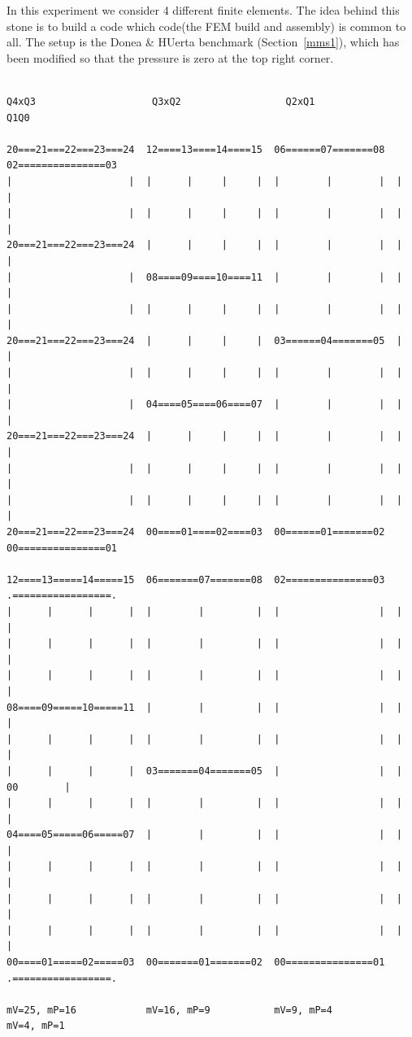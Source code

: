 In this experiment we consider 4 different finite elements. The idea behind this stone 
is to build a code which code(the FEM build and assembly) is common to all. 
The setup is the Donea \& HUerta benchmark (Section~\ref{mms1}), which has been modified so that 
the pressure is zero at the top right corner.

\begin{verbatim}

Q4xQ3                    Q3xQ2                  Q2xQ1                 Q1Q0

20===21===22===23===24  12====13====14====15  06======07=======08  02===============03
|                    |  |      |     |     |  |        |        |  |                 |
|                    |  |      |     |     |  |        |        |  |                 |
20===21===22===23===24  |      |     |     |  |        |        |  |                 |
|                    |  08====09====10====11  |        |        |  |                 |
|                    |  |      |     |     |  |        |        |  |                 |
20===21===22===23===24  |      |     |     |  03======04=======05  |                 |
|                    |  |      |     |     |  |        |        |  |                 |
|                    |  04====05====06====07  |        |        |  |                 |
20===21===22===23===24  |      |     |     |  |        |        |  |                 |
|                    |  |      |     |     |  |        |        |  |                 |
|                    |  |      |     |     |  |        |        |  |                 |
20===21===22===23===24  00====01====02====03  00======01=======02  00===============01 

12====13=====14=====15  06=======07=======08  02===============03  .=================.
|      |      |      |  |        |         |  |                 |  |                 |
|      |      |      |  |        |         |  |                 |  |                 |
|      |      |      |  |        |         |  |                 |  |                 |
08====09=====10=====11  |        |         |  |                 |  |                 |
|      |      |      |  |        |         |  |                 |  |                 |
|      |      |      |  03=======04=======05  |                 |  |       00        |
|      |      |      |  |        |         |  |                 |  |                 |
04====05=====06=====07  |        |         |  |                 |  |                 |
|      |      |      |  |        |         |  |                 |  |                 |
|      |      |      |  |        |         |  |                 |  |                 |
|      |      |      |  |        |         |  |                 |  |                 |
00====01=====02=====03  00=======01=======02  00===============01  .=================.

mV=25, mP=16            mV=16, mP=9           mV=9, mP=4           mV=4, mP=1      

\end{verbatim}

